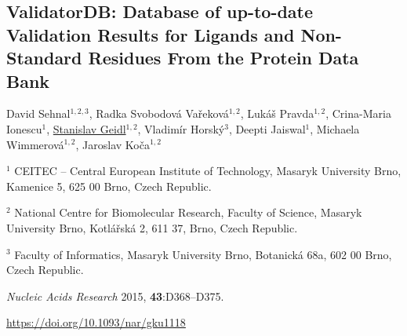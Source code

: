 \begin{center}
\section{\centering ValidatorDB: Database of up-to-date
Validation Results for Ligands and Non-Standard Residues From the Protein Data Bank}

David Sehnal$^{1, 2, 3}$,
Radka Svobodová Vařeková$^{1, 2}$,
Lukáš Pravda$^{1, 2}$,
Crina-Maria Ionescu$^1$,
\underline{Stanislav Geidl}$^{1, 2}$,
Vladimír Horský$^3$,
Deepti Jaiswal$^1$,
Michaela Wimmerová$^{1, 2}$,
Jaroslav Koča$^{1, 2}$

\vspace{1cm}

$^1$ CEITEC -- Central European Institute of Technology,
Masaryk University Brno, Kamenice 5, 625 00 Brno, Czech Republic.

$^2$ National Centre for Biomolecular Research, Faculty of Science,
Masaryk University Brno, Kotlářská 2, 611 37, Brno, Czech Republic.

$^3$ Faculty of Informatics, Masaryk University Brno, Botanická 68a, 602 00 Brno,
Czech Republic.

\vspace{1cm}

\textit{Nucleic Acids Research} 2015, \textbf{43}:D368--D375.

\vspace{1cm}

\url{https://doi.org/10.1093/nar/gku1118}

\end{center}



